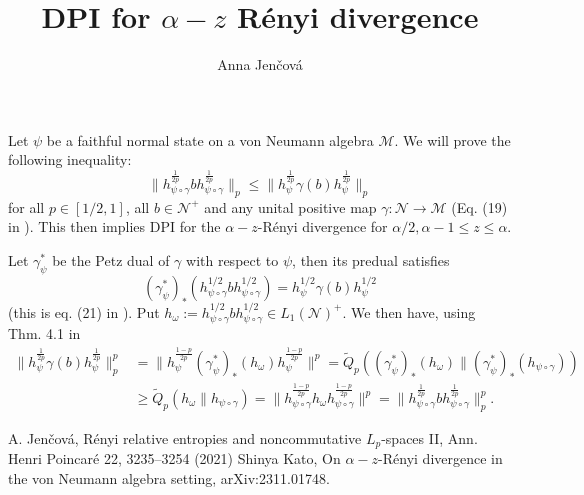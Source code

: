 \documentclass[12pt]{article}
\title{DPI for $\alpha-z$ R\'enyi divergence}
\author{Anna Jen\v cov\'a}
\theoremstyle{definition}
\theoremstyle{remark}
\def\Me{\mathcal M}
\def\Ne{\mathcal N}
\begin{document}
\maketitle


Let $\psi$ be a faithful normal state on a von Neumann algebra $\Me$. We will prove the following inequality:
\begin{equation}\label{eq:goal}
\|h_{\psi\circ\gamma}^{\frac{1}{2p}}bh_{\psi\circ\gamma}^{\frac{1}{2p}}\|_p\le
\|h_{\psi}^{\frac{1}{2p}}\gamma(b)h_{\psi}^{\frac{1}{2p}}\|_p
\end{equation}
for all $p\in [1/2,1]$, all $b\in \Ne^+$ and any unital positive  map $\gamma: \Ne\to
\Me$ (Eq. (19) in \cite{kato2023onrenyi}). This then implies DPI for the $\alpha-z$-R\'enyi divergence for
$\alpha/2,\alpha-1\le z\le \alpha$.

Let $\gamma_\psi^*$ be the Petz dual of $\gamma$ with respect to $\psi$, then 
its predual satisfies
\[
(\gamma^*_\psi)_*(h_{\psi\circ\gamma}^{1/2}bh_{\psi\circ\gamma}^{1/2})=h_\psi^{1/2}\gamma(b)h_\psi^{1/2}
\]
(this is eq. (21) in \cite{kato2023onrenyi}). Put
$h_\omega:=h_{\psi\circ\gamma}^{1/2}bh_{\psi\circ\gamma}^{1/2}\in L_1(\Ne)^+$. We then have, using Thm.
4.1 in \cite{jencova2021renyi}
\begin{align*}
\|h_{\psi}^{\frac{1}{2p}}\gamma(b)h_{\psi}^{\frac{1}{2p}}\|^p_p&=
\|h_\psi^{\frac{1-p}{2p}}(\gamma_\psi^*)_*(h_\omega)h_\psi^{\frac{1-p}{2p}}\|^p=\tilde
Q_p((\gamma_\psi^*)_*(h_\omega)\|(\gamma_\psi^*)_*(h_{\psi\circ\gamma}))\\
&\ge \tilde Q_p(h_\omega\|h_{\psi\circ\gamma})=\|
h_{\psi\circ\gamma}^{\frac{1-p}{2p}}h_\omega
h_{\psi\circ\gamma}^{\frac{1-p}{2p}}\|^p=\|h_{\psi\circ\gamma}^{\frac{1}{2p}}bh_{\psi\circ\gamma}^{\frac{1}{2p}}\|^p_p.
\end{align*}

\begin{thebibliography}{99}

 A. Jen\v cov\'a, Rényi relative entropies and noncommutative
$L_p$-spaces II, Ann. Henri Poincaré 22, 3235–3254 (2021)
 Shinya Kato, On $\alpha-z$-R\'enyi divergence in the von Neumann
algebra setting, arXiv:2311.01748.

\end{thebibliography}
\end{document}
